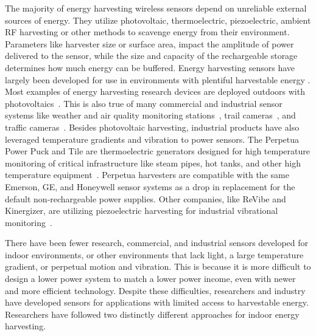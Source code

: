The majority of energy harvesting wireless sensors depend on unreliable external sources of energy. 
They utilize photovoltaic, thermoelectric, piezoelectric, ambient RF harvesting or other methods to scavenge energy from their environment. 
Parameters like harvester size or surface area, impact the amplitude of power delivered to the sensor, 
while the size and capacity of the rechargeable storage determines how much energy can be buffered. 
Energy harvesting sensors
have largely been developed for use in environments with plentiful harvestable energy
.
Most examples of energy harvesting research devices are deployed outdoors with photovoltaics~\cite{jiang2005perpetual, kansal2007power, corke2007long, lin2005heliomote, taneja2008design, adkins2018signpost}.
This is also true of many commercial and industrial sensor systems like weather and air quality monitoring stations~\cite{davis_weather}, trail cameras~\cite{spypoint_camera}, and traffic cameras~\cite{wanco_traffic}.
Besides photovoltaic harvesting, industrial products have also leveraged temperature gradients and vibration to power sensors. The Perpetua Power Puck and Tile are thermoelectric generators designed for high temperature monitoring of critical infrastructure like steam pipes, hot tanks, and other high temperature equipment~\cite{perpetua}.
Perpetua harvesters are compatible with the same Emerson, GE, and Honeywell sensor systems as a drop in replacement for the default non-rechargeable power supplies. Other companies, like ReVibe and Kinergizer, are utilizing piezoelectric harvesting for industrial vibrational monitoring~\cite{revibe,kinergizer}.

There have been fewer research, commercial, and industrial sensors developed for indoor environments, or other environments that lack light, a large temperature gradient, or perpetual motion and vibration.
This is because it is more difficult to design a lower power system to match a lower power income, even with newer and more efficient technology.
Despite these difficulties, researchers and industry have developed sensors for applications with limited access to harvestable energy.
Researchers have followed two distinctly different approaches for indoor energy harvesting.

